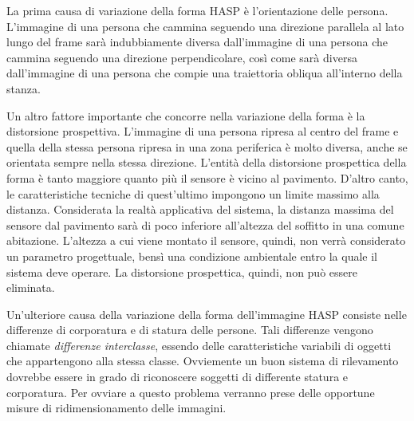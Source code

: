                 La prima causa di variazione della forma HASP è l'orientazione delle persona.
                L'immagine di una persona che cammina seguendo una direzione parallela al lato lungo del frame sarà indubbiamente diversa dall'immagine di una persona che cammina seguendo una direzione perpendicolare, così come sarà diversa dall'immagine di una persona che compie una traiettoria obliqua all'interno della stanza.

                Un altro fattore importante che concorre nella variazione della forma è la distorsione prospettiva.
                L'immagine di una persona ripresa al centro del frame e quella della stessa persona ripresa in una zona periferica è molto diversa, anche se orientata sempre nella stessa direzione.
                L'entità della distorsione prospettica della forma è tanto maggiore quanto più il sensore è vicino al pavimento. D'altro canto, le caratteristiche tecniche di quest'ultimo impongono un limite massimo alla distanza.
                Considerata la realtà applicativa del sistema, la distanza massima del sensore dal pavimento sarà di poco inferiore all'altezza del soffitto in una comune abitazione.
                L'altezza a cui viene montato il sensore, quindi, non verrà considerato un parametro progettuale, bensì una condizione ambientale entro la quale il sistema deve operare.
                La distorsione prospettica, quindi, non può essere eliminata.

                Un'ulteriore causa della variazione della forma dell'immagine HASP consiste nelle differenze di corporatura e di statura delle persone.
                Tali differenze vengono chiamate \emph{differenze interclasse}, essendo delle caratteristiche variabili di oggetti che appartengono alla stessa classe.
                Ovviemente un buon sistema di rilevamento dovrebbe essere in grado di riconoscere soggetti di differente statura e corporatura.
                Per ovviare a questo problema verranno prese delle opportune misure di ridimensionamento delle immagini.

